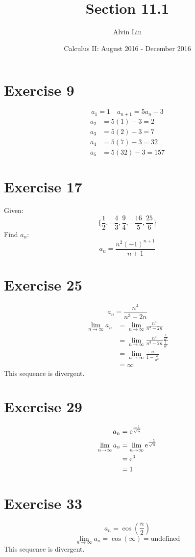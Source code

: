 \documentclass[letterpaper, 12pt]{math}
\title{Section 11.1}
\author{Alvin Lin}
\date{Calculus II: August 2016 - December 2016}
\begin{document}
\maketitle

\section*{Exercise 9}
\[ a_{1} = 1 \quad a_{n+1} = 5a_{n}-3 \]
\begin{align*}
  a_{2} &= 5(1)-3 = 2 \\
  a_{3} &= 5(2)-3 = 7 \\
  a_{4} &= 5(7)-3 = 32 \\
  a_{5} &= 5(32)-3 = 157
\end{align*}

\section*{Exercise 17}
Given:
\[ \bigg\{\frac{1}{2},-\frac{4}{3},
   \frac{9}{4},-\frac{16}{5},\frac{25}{6}\bigg\} \]
Find \( a_{n} \):
\[ a_{n} = \frac{n^{2}(-1)^{n+1}}{n+1} \]

\section*{Exercise 25}
\[ a_{n} = \frac{n^{4}}{n^{3}-2n} \]
\begin{align*}
  \lim_{n\to\infty}{a_{n}} &= \lim_{n\to\infty}{\frac{n^{4}}{n^{3}-2n}} \\
  &= \lim_{n\to\infty}{\frac{n^{4}}{n^{3}-2n}
    \frac{\frac{1}{n^{3}}}{\frac{1}{n^{3}}}} \\
  &= \lim_{n\to\infty}{\frac{n}{1-\frac{2}{n^{2}}}} \\
  &= \infty
\end{align*}
This sequence is divergent.

\section*{Exercise 29}
\[ a_{n} = \mathrm{e}^{\frac{-1}{\sqrt{n}}} \]
\begin{align*}
  \lim_{n\to\infty}{a_{n}} &= \lim_{n\to\infty}{\mathrm{e}^{\frac{-1}{\sqrt{n}}}} \\
  &= \mathrm{e}^{0} \\
  &= 1
\end{align*}

\section*{Exercise 33}
\[ a_{n} = \cos(\frac{n}{2}) \]
\[ \lim_{n\to\infty}{a_{n}} = \cos(\infty) = \mathrm{undefined} \]
This sequence is divergent.
\end{document}
